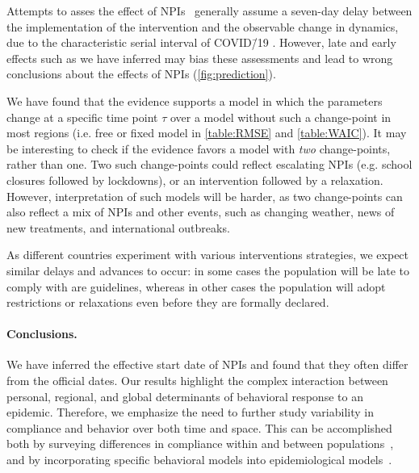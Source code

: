 \documentclass[12pt]{extarticle}
\newcommand{\covid}{COVID\=/19 }
\begin{document}
Attempts to asses the effect of NPIs~\citep{Banholzer2020,Flaxman2020} generally assume a seven-day delay between the implementation of the intervention and the observable change in dynamics, due to the characteristic serial interval of \covid\citep{Gatto2020}.
However, late and early effects such as we have inferred may bias these assessments and lead to wrong conclusions about the effects of NPIs (\autoref{fig:prediction}).

We have found that the evidence supports a model in which the parameters change at a specific time point $\tau$ over a model without such a change-point in most regions (i.e. free or fixed model in \autoref{table:RMSE} and \autoref{table:WAIC}). 
It may be interesting to check if the evidence favors a model with \emph{two} change-points, rather than one. 
Two such change-points could reflect escalating NPIs (e.g. school closures followed by lockdowns), or an intervention followed by a relaxation.
However, interpretation of such models will be harder, as two change-points can also reflect a mix of NPIs and other events, such as changing weather, news of new treatments, and international outbreaks.

As different countries experiment with various interventions strategies, we expect similar delays and advances to occur: in some cases the population will be late to comply with are guidelines, whereas in other cases the population will adopt restrictions or relaxations even before they are formally declared.

\paragraph*{Conclusions.}
We have inferred the effective start date of NPIs and found that they often differ from the official dates.
Our results highlight the complex interaction between personal, regional, and global determinants of behavioral response to an epidemic.
Therefore, we emphasize the need to further study variability in compliance and behavior over both time and space. This can be accomplished both by surveying differences in compliance within and between populations~\citep{Atchison2020}, and by incorporating specific behavioral models into epidemiological models~\citep{Arthur2020,Fenichela2011,Walters2013}.
\end{document}
